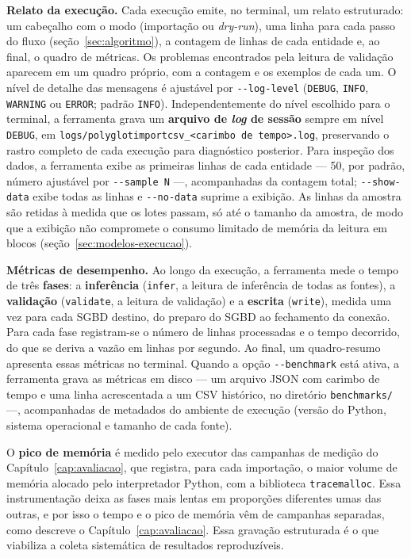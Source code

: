 \textbf{Relato da execução.} Cada execução emite, no terminal, um relato estruturado: um
cabeçalho com o modo (importação ou \textit{dry-run}), uma linha para cada passo do fluxo
(seção~\ref{sec:algoritmo}), a contagem de linhas de cada entidade e, ao final, o quadro de
métricas. Os problemas encontrados pela leitura de validação aparecem em um quadro próprio,
com a contagem e os exemplos de cada um. O nível de detalhe das mensagens é ajustável por
\texttt{-{}-log-level} (\texttt{DEBUG}, \texttt{INFO}, \texttt{WARNING} ou
\texttt{ERROR}; padrão \texttt{INFO}). Independentemente do nível escolhido para o
terminal, a ferramenta grava um \textbf{arquivo de \textit{log} de sessão} sempre em
nível \texttt{DEBUG}, em \texttt{logs/polyglotimportcsv\_\textless carimbo de
tempo\textgreater.log}, preservando o rastro completo de cada execução para diagnóstico
posterior. Para inspeção dos dados, a ferramenta exibe as primeiras linhas de cada
entidade --- 50, por padrão, número ajustável por \texttt{-{}-sample}~\texttt{N} ---,
acompanhadas da contagem total; \texttt{-{}-show-data} exibe todas as linhas e
\texttt{-{}-no-data} suprime a exibição. As linhas da amostra são retidas à medida que os
lotes passam, só até o tamanho da amostra, de modo que a exibição não compromete o consumo
limitado de memória da leitura em blocos (seção~\ref{sec:modelos-execucao}).

\textbf{Métricas de desempenho.} Ao longo da execução, a ferramenta mede o tempo de três
\textbf{fases}: a \textbf{inferência} (\texttt{infer}, a leitura de inferência de todas as
fontes), a \textbf{validação} (\texttt{validate}, a leitura de validação) e a
\textbf{escrita} (\texttt{write}), medida uma vez para cada SGBD destino, do preparo do
SGBD ao fechamento da conexão. Para cada fase registram-se o número de linhas processadas e
o tempo decorrido, do que se deriva a vazão em linhas por segundo. Ao final, um
quadro-resumo apresenta essas métricas no terminal. Quando a opção
\texttt{-{}-benchmark} está ativa, a ferramenta grava as métricas em disco --- um arquivo
JSON com carimbo de tempo e uma linha acrescentada a um CSV histórico, no diretório
\texttt{benchmarks/} ---, acompanhadas de metadados do ambiente de execução (versão do
Python, sistema operacional e tamanho de cada fonte).

O \textbf{pico de memória} é medido pelo executor das campanhas de medição do
Capítulo~\ref{cap:avaliacao}, que registra, para cada importação, o maior volume de
memória alocado pelo interpretador Python, com a biblioteca \texttt{tracemalloc}. Essa
instrumentação deixa as fases mais lentas em proporções diferentes umas das outras, e por
isso o tempo e o pico de memória vêm de campanhas separadas, como descreve o
Capítulo~\ref{cap:avaliacao}. Essa gravação estruturada é o que viabiliza a coleta
sistemática de resultados reproduzíveis.


